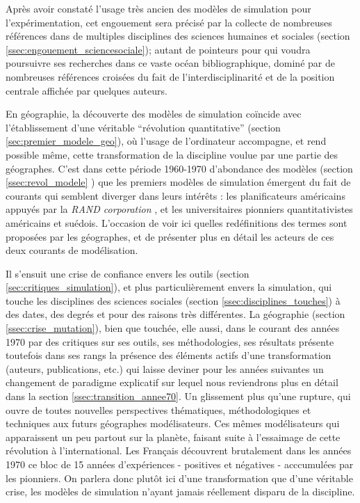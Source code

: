 Après avoir constaté l'usage très ancien des modèles de simulation pour l'expérimentation, cet engouement sera précisé par la collecte de nombreuses références dans de multiples disciplines des sciences humaines et sociales (section \ref{ssec:engouement_sciencesociale}); autant de pointeurs pour qui voudra poursuivre ses recherches dans ce vaste océan bibliographique, dominé par de nombreuses références croisées du fait de l'interdisciplinarité et de la position centrale affichée par quelques auteurs.

En géographie, la découverte des modèles de simulation coïncide avec l'établissement d'une véritable \enquote{révolution quantitative} (section \ref{sec:premier_modele_geo}), où l'usage de l'ordinateur accompagne, et rend possible même, cette transformation de la discipline voulue par une partie des géographes. C'est dans cette période 1960-1970 d'abondance des modèles (section \ref{ssec:revol_modele} ) que les premiers modèles de simulation émergent du fait de courants qui semblent diverger dans leurs intérêts : les planificateurs américains appuyés par la \textit{RAND corporation} , et les universitaires pionniers quantitativistes américains et suédois. L'occasion de voir ici quelles redéfinitions des termes sont proposées par les géographes, et de présenter plus en détail les acteurs de ces deux courants de modélisation.

Il s'ensuit une crise de confiance envers les outils  (section \ref{sec:critiques_simulation}), et plus particulièrement envers la simulation, qui touche les disciplines des sciences sociales (section \ref{ssec:disciplines_touches}) à des dates, des degrés et pour des raisons très différentes. La géographie (section \ref{ssec:crise_mutation}), bien que touchée, elle aussi, dans le courant des années 1970 par des critiques sur ses outils, ses méthodologies, ses résultats présente toutefois dans ses rangs la présence des éléments actifs d'une transformation (auteurs, publications, etc.) qui laisse deviner pour les années suivantes un changement de paradigme explicatif sur lequel nous reviendrons plus en détail dans la section \ref{ssec:transition_annee70}. Un glissement plus qu'une rupture, qui ouvre de toutes nouvelles perspectives thématiques, méthodologiques et techniques aux futurs géographes modélisateurs. Ces mêmes modélisateurs qui apparaissent un peu partout sur la planète, faisant suite à l'essaimage de cette révolution à l'international. Les Français découvrent brutalement dans les années 1970 ce bloc de 15 années d'expériences - positives et négatives - acccumulées par les pionniers. On parlera donc plutôt ici d'une transformation que d'une véritable crise, les modèles de simulation n'ayant jamais réellement disparu de la discipline.

